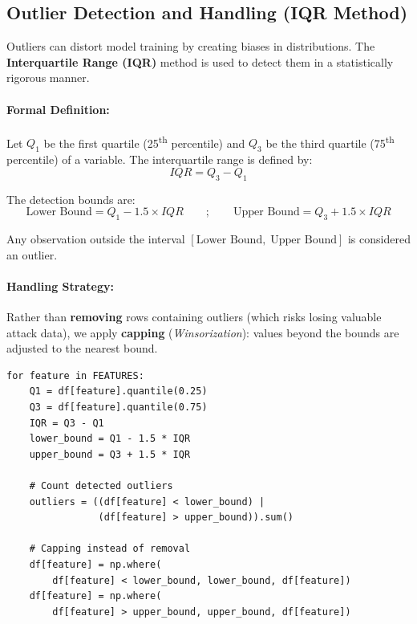 \subsection{Outlier Detection and Handling (IQR Method)}

Outliers can distort model training by creating biases in distributions. The \textbf{Interquartile Range (IQR)} method is used to detect them in a statistically rigorous manner.

\paragraph{Formal Definition:} Let $Q_1$ be the first quartile (25\textsuperscript{th} percentile) and $Q_3$ be the third quartile (75\textsuperscript{th} percentile) of a variable. The interquartile range is defined by:
\begin{equation}
    IQR = Q_3 - Q_1
\end{equation}

\noindent The detection bounds are:
\begin{equation}
    \text{Lower Bound} = Q_1 - 1.5 \times IQR \qquad ; \qquad \text{Upper Bound} = Q_3 + 1.5 \times IQR
\end{equation}

\noindent Any observation outside the interval $[\text{Lower Bound},\; \text{Upper Bound}]$ is considered an outlier.

\paragraph{Handling Strategy:} Rather than \textbf{removing} rows containing outliers (which risks losing valuable attack data), we apply \textbf{capping} (\textit{Winsorization}): values beyond the bounds are adjusted to the nearest bound.

\begin{lstlisting}[caption={Outlier detection and capping using IQR}]
for feature in FEATURES:
    Q1 = df[feature].quantile(0.25)
    Q3 = df[feature].quantile(0.75)
    IQR = Q3 - Q1
    lower_bound = Q1 - 1.5 * IQR
    upper_bound = Q3 + 1.5 * IQR

    # Count detected outliers
    outliers = ((df[feature] < lower_bound) |
                (df[feature] > upper_bound)).sum()

    # Capping instead of removal
    df[feature] = np.where(
        df[feature] < lower_bound, lower_bound, df[feature])
    df[feature] = np.where(
        df[feature] > upper_bound, upper_bound, df[feature])
\end{lstlisting}

